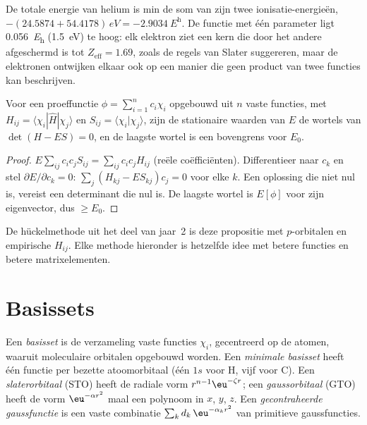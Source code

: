 \begin{example}\label{ex:b3:computational-chemistry:helium}
De totale energie van helium is min de som van zijn twee
ionisatie-energieën,
$-(24.5874 + 54.4178)\,\unit{eV} = \qty{-2.9034}{\hartree}$. De functie met
één parameter ligt \qty{0.056}{\hartree} (\qty{1.5}{eV}) te hoog: elk
elektron ziet een kern die door het andere afgeschermd is tot
$Z_{\mathrm{eff}} = 1.69$, zoals de regels van Slater
suggereren, maar de elektronen ontwijken elkaar ook op een manier die geen
product van twee functies kan beschrijven.
\end{example}

\begin{proposition}\label{prop:b3:computational-chemistry:linear-variation}
Voor een proeffunctie $\phi = \sum_{i=1}^n c_i\chi_i$ opgebouwd uit $n$ vaste functies,
met $H_{ij} = \langle\chi_i|\hat H|\chi_j\rangle$ en $S_{ij} = \langle\chi_i|\chi_j
\rangle$, zijn de stationaire waarden van $E$ de wortels van $\det(H - ES) = 0$, en
de laagste wortel is een bovengrens voor $E_0$.
\end{proposition}

\begin{proof}
$E\sum_{ij}c_ic_jS_{ij} = \sum_{ij}c_ic_jH_{ij}$ (reële coëfficiënten).
Differentieer naar $c_k$ en stel $\partial E/\partial c_k = 0$: $\sum_j(H_{kj} -
ES_{kj})c_j = 0$ voor elke $k$. Een oplossing die niet nul is, vereist een
determinant die nul is. De laagste wortel is $E[\phi]$ voor zijn
eigenvector, dus $\ge E_0$.
\end{proof}

De hückelmethode uit het deel van jaar~2 is deze propositie met
$p$-orbitalen en empirische $H_{ij}$. Elke methode hieronder is hetzelfde
idee met betere functies en betere matrixelementen.

\section{Basissets}

\begin{definition}\label{def:b3:computational-chemistry:basis}
Een \emph{basisset} is de verzameling vaste functies $\chi_i$,
gecentreerd op de atomen, waaruit moleculaire orbitalen opgebouwd worden.
Een \emph{minimale basisset} heeft één functie per
bezette atoomorbitaal (één $1s$ voor H, vijf voor C). Een
\emph{slaterorbitaal} (STO) heeft de radiale vorm
$r^{n-1}\eu^{-\zeta r}$; een \emph{gaussorbitaal}
(GTO) heeft de vorm $\eu^{-\alpha r^2}$ maal een polynoom in $x$, $y$,
$z$. Een \emph{gecontraheerde gaussfunctie}
is een vaste combinatie $\sum_kd_k\,\eu^{-\alpha_kr^2}$ van primitieve gaussfuncties.
\end{definition}

